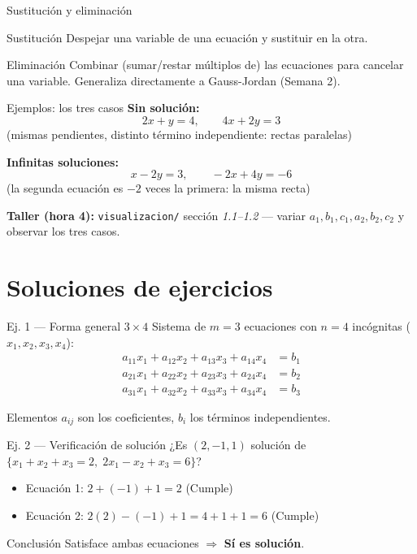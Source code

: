\documentclass[11pt]{beamer}
\begin{document}
\begin{frame}{Sustitución y eliminación}
  \begin{block}{Sustitución}
    Despejar una variable de una ecuación y sustituir en la otra.
  \end{block}
  \begin{block}{Eliminación}
    Combinar (sumar/restar múltiplos de) las ecuaciones para cancelar una variable. Generaliza
    directamente a Gauss-Jordan (Semana 2).
  \end{block}
\end{frame}

\begin{frame}{Ejemplos: los tres casos}
  \textbf{Sin solución:}
  \[
    2x+y=4, \qquad 4x+2y=3
  \]
  (mismas pendientes, distinto término independiente: rectas paralelas)

  \vfill
  \textbf{Infinitas soluciones:}
  \[
    x-2y=3, \qquad -2x+4y=-6
  \]
  (la segunda ecuación es $-2$ veces la primera: la misma recta)

  \vfill
  \textbf{Taller (hora 4):} \texttt{visualizacion/} sección \emph{1.1--1.2} --- variar
  $a_1,b_1,c_1,a_2,b_2,c_2$ y observar los tres casos.
\end{frame}

\section{Soluciones de ejercicios}

\begin{frame}{Ej. 1 — Forma general $3 \times 4$}
  Sistema de $m=3$ ecuaciones con $n=4$ incógnitas ($x_1,x_2,x_3,x_4$):
  \[
  \begin{aligned}
    a_{11}x_1 + a_{12}x_2 + a_{13}x_3 + a_{14}x_4 &= b_1 \\
    a_{21}x_1 + a_{22}x_2 + a_{23}x_3 + a_{24}x_4 &= b_2 \\
    a_{31}x_1 + a_{32}x_2 + a_{33}x_3 + a_{34}x_4 &= b_3
  \end{aligned}
  \]
  \begin{block}{Elementos}
    $a_{ij}$ son los coeficientes, $b_i$ los términos independientes.
  \end{block}
\end{frame}

\begin{frame}{Ej. 2 — Verificación de solución}
  ¿Es $(2,-1,1)$ solución de $\{x_1+x_2+x_3=2,\; 2x_1-x_2+x_3=6\}$?
  \vfill
  \begin{itemize}
    \item Ecuación 1: $2 + (-1) + 1 = 2$ \quad \textcolor{unicaucaverde}{\checkmark (Cumple)}
    \item Ecuación 2: $2(2) - (-1) + 1 = 4 + 1 + 1 = 6$ \quad \textcolor{unicaucaverde}{\checkmark (Cumple)}
  \end{itemize}
  \vfill
  \begin{alertblock}{Conclusión}
    Satisface ambas ecuaciones $\Rightarrow$ \textbf{Sí es solución}.
  \end{alertblock}
\end{frame}
\end{document}

